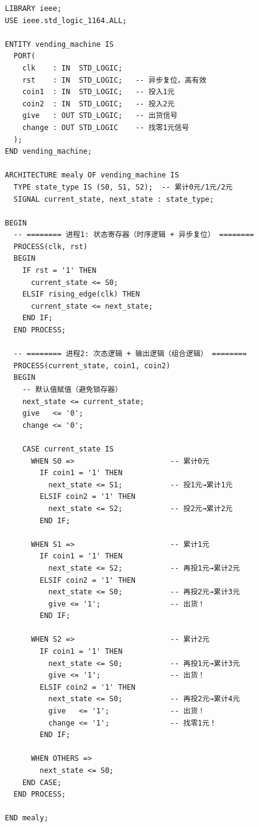 \begin{lstlisting}[language=VDL, caption={自动售货机控制器——Mealy型状态机VHDL代码}]
LIBRARY ieee;
USE ieee.std_logic_1164.ALL;

ENTITY vending_machine IS
  PORT(
    clk    : IN  STD_LOGIC;
    rst    : IN  STD_LOGIC;   -- 异步复位，高有效
    coin1  : IN  STD_LOGIC;   -- 投入1元
    coin2  : IN  STD_LOGIC;   -- 投入2元
    give   : OUT STD_LOGIC;   -- 出货信号
    change : OUT STD_LOGIC    -- 找零1元信号
  );
END vending_machine;

ARCHITECTURE mealy OF vending_machine IS
  TYPE state_type IS (S0, S1, S2);  -- 累计0元/1元/2元
  SIGNAL current_state, next_state : state_type;

BEGIN
  -- ======== 进程1: 状态寄存器（时序逻辑 + 异步复位） ========
  PROCESS(clk, rst)
  BEGIN
    IF rst = '1' THEN
      current_state <= S0;
    ELSIF rising_edge(clk) THEN
      current_state <= next_state;
    END IF;
  END PROCESS;

  -- ======== 进程2: 次态逻辑 + 输出逻辑（组合逻辑） ========
  PROCESS(current_state, coin1, coin2)
  BEGIN
    -- 默认值赋值（避免锁存器）
    next_state <= current_state;
    give   <= '0';
    change <= '0';

    CASE current_state IS
      WHEN S0 =>                      -- 累计0元
        IF coin1 = '1' THEN
          next_state <= S1;           -- 投1元→累计1元
        ELSIF coin2 = '1' THEN
          next_state <= S2;           -- 投2元→累计2元
        END IF;

      WHEN S1 =>                      -- 累计1元
        IF coin1 = '1' THEN
          next_state <= S2;           -- 再投1元→累计2元
        ELSIF coin2 = '1' THEN
          next_state <= S0;           -- 再投2元→累计3元
          give <= '1';                -- 出货！
        END IF;

      WHEN S2 =>                      -- 累计2元
        IF coin1 = '1' THEN
          next_state <= S0;           -- 再投1元→累计3元
          give <= '1';                -- 出货！
        ELSIF coin2 = '1' THEN
          next_state <= S0;           -- 再投2元→累计4元
          give   <= '1';              -- 出货！
          change <= '1';              -- 找零1元！
        END IF;

      WHEN OTHERS =>
        next_state <= S0;
    END CASE;
  END PROCESS;

END mealy;
\end{lstlisting}


